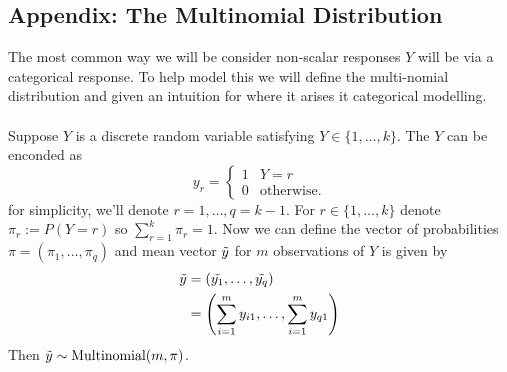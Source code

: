\newpage
\subsection{Appendix: The Multinomial Distribution}
The most common way we will be consider non-scalar responses $Y$ will be via a categorical response. To help model this we will define the multi-nomial distribution and given an intuition for where it arises it categorical modelling. \\
\\
Suppose $Y$ is a discrete random variable satisfying $Y\in\{1,\dots,k\}$. The $Y$ can be enconded as 
    \[y_r =\begin{cases} 
      1 & Y = r \\
      0 & \text{otherwise.}
   \end{cases}
\]
for simplicity, we'll denote $r = 1,\dots,q=k-1$. For $r\in\{1,\dots,k\}$ denote $\pi_r := P(Y=r)$ so $\sum_{r=1}^{k}\pi_r = 1$. Now we can define the vector of probabilities $\pi = (\pi_1, \dots, \pi_q)$ and mean vector $\Tilde{y}$  for $m$ observations of $Y$ is given by 
\begin{align*}
    \Tilde{y} &= (\Tilde{y_1}, \dots, \Tilde{y_q}) \\
    &=\left(\sum_{i=1}^{m}y_{i1}, \dots, \sum_{i=1}^{m}y_{q1} \right)
\end{align*}
Then $\Tilde{y}\sim \text{Multinomial}(m,\pi)$.

\begin{definition}
    
\end{definition}


